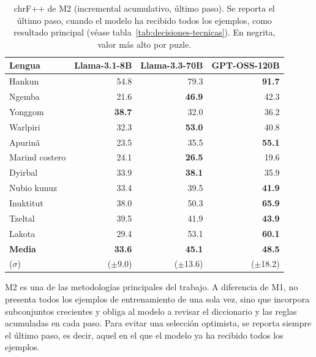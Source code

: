 \begin{table}[H]
	\centering
	\caption{chrF++ de M2 (incremental acumulativo, último paso). Se reporta el último paso, cuando el modelo ha recibido todos los ejemplos, como resultado principal (véase tabla~\ref{tab:decisiones-tecnicas}). En negrita, valor más alto por puzle.}
	\label{tab:resultados_m2}
	{\fontsize{10.5pt}{12pt}\selectfont
		\begin{tabular*}{0.95\textwidth}{@{\extracolsep{\fill}} lrrr}
			\toprule
			\textbf{Lengua} & \textbf{Llama-3.1-8B} & \textbf{Llama-3.3-70B} & \textbf{GPT-OSS-120B} \\
			\midrule
			Hankun          & 54.8              & 79.3              & \textbf{91.7} \\
			Ngemba          & 21.6              & \textbf{46.9}     & 42.3          \\
			Yonggom         & \textbf{38.7}     & 32.0              & 36.2          \\
			Warlpiri        & 32.3              & \textbf{53.0}     & 40.8          \\
			Apurinã         & 23.5              & 35.5              & \textbf{55.1} \\
			Marind costero  & 24.1              & \textbf{26.5}     & 19.6          \\
			Dyirbal         & 33.9              & \textbf{38.1}     & 35.9          \\
			Nubio kunuz     & 33.4              & 39.5              & \textbf{41.9} \\
			Inuktitut       & 38.0              & 50.3              & \textbf{65.9} \\
			Tzeltal         & 39.5              & 41.9              & \textbf{43.9} \\
			Lakota          & 29.4              & 53.1              & \textbf{60.1} \\
			\midrule
			\textbf{Media}      & \textbf{33.6} & \textbf{45.1} & \textbf{48.5} \\
			($\sigma$) & ($\pm$9.0) & ($\pm$13.6) & ($\pm$18.2) \\
			\bottomrule
		\end{tabular*}
	}
\end{table}

M2 es una de las metodologías principales del trabajo. A diferencia de M1, no presenta todos los ejemplos de entrenamiento de una sola vez, sino que incorpora subconjuntos crecientes y obliga al modelo a revisar el diccionario y las reglas acumuladas en cada paso. Para evitar una selección optimista, se reporta siempre el último paso, es decir, aquel en el que el modelo ya ha recibido todos los ejemplos.

